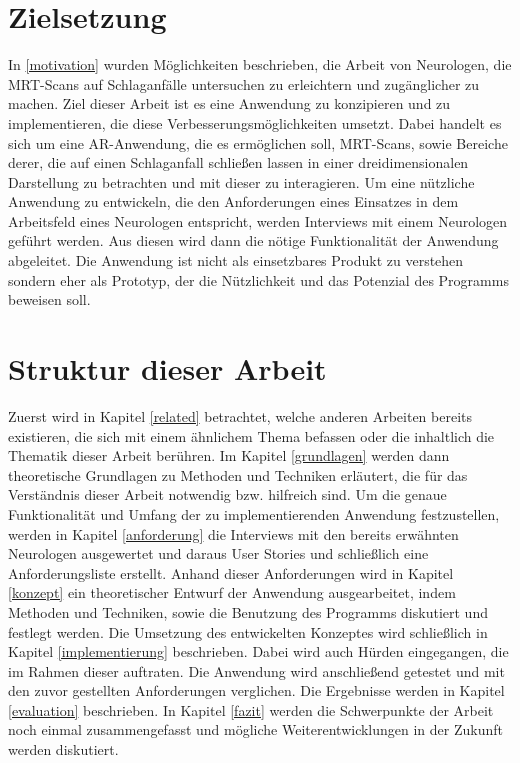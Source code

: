 \section{Zielsetzung}

In \ref{motivation} wurden Möglichkeiten beschrieben, die Arbeit von Neurologen, die MRT-Scans auf Schlaganfälle untersuchen zu erleichtern und zugänglicher zu machen. Ziel dieser Arbeit ist es eine Anwendung zu konzipieren und zu implementieren, die diese Verbesserungsmöglichkeiten umsetzt. Dabei handelt es sich um eine AR-Anwendung, die es ermöglichen soll, MRT-Scans, sowie Bereiche derer, die auf einen Schlaganfall schließen lassen in einer dreidimensionalen Darstellung zu betrachten und mit dieser zu interagieren. 
Um eine nützliche Anwendung zu entwickeln, die den Anforderungen eines Einsatzes in dem Arbeitsfeld eines Neurologen entspricht, werden Interviews mit einem Neurologen geführt werden. Aus diesen wird dann die nötige Funktionalität der Anwendung abgeleitet. 
Die Anwendung ist nicht als einsetzbares Produkt zu verstehen sondern eher als Prototyp, der die Nützlichkeit und das Potenzial des Programms beweisen soll.

\section{Struktur dieser Arbeit}

Zuerst wird in Kapitel \ref{related} betrachtet, welche anderen Arbeiten bereits existieren, die sich mit einem ähnlichem Thema befassen oder die inhaltlich die Thematik dieser Arbeit berühren. 
Im Kapitel \ref{grundlagen} werden dann theoretische Grundlagen zu Methoden und Techniken erläutert, die für das Verständnis dieser Arbeit notwendig bzw. hilfreich sind.
Um die genaue Funktionalität und Umfang der zu implementierenden Anwendung festzustellen, werden in Kapitel \ref{anforderung} die Interviews mit den bereits erwähnten Neurologen ausgewertet und daraus User Stories und schließlich eine Anforderungsliste erstellt.
Anhand dieser Anforderungen wird in Kapitel \ref{konzept} ein theoretischer Entwurf der Anwendung ausgearbeitet, indem Methoden und Techniken, sowie die Benutzung des Programms diskutiert und festlegt werden.
Die Umsetzung des entwickelten Konzeptes wird schließlich in Kapitel \ref{implementierung} beschrieben. Dabei wird auch Hürden eingegangen, die im Rahmen dieser auftraten.
Die Anwendung wird anschließend getestet und mit den zuvor gestellten Anforderungen verglichen. Die Ergebnisse werden in Kapitel \ref{evaluation} beschrieben. 
In Kapitel \ref{fazit} werden die Schwerpunkte der Arbeit noch einmal zusammengefasst und mögliche Weiterentwicklungen in der Zukunft werden diskutiert. 
 